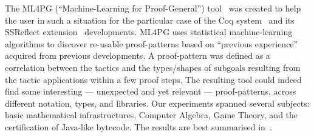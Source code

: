 % 
% 
% 


The ML4PG (``Machine-Learning for Proof-General'') tool~\cite{KHG13,CICM13,HK14} was created to help the user in such a situation for the particular case of the Coq system~\cite{Coq} and its SSReflect extension~\cite{SSReflect} developments. ML4PG uses statistical machine-learning algorithms to discover re-usable proof-patterns based on ``previous experience'' acquired from previous developments. A proof-pattern was defined as a correlation between the tactics and the types/shapes of subgoals resulting from the tactic applications within a few proof steps. The resulting tool could indeed find some interesting --- unexpected and yet relevant --- proof-patterns,
across different notation, types, and libraries. Our experiments spanned several subjects: basic mathematical infrastructures, Computer Algebra, Game Theory, and the certification of Java-like bytecode. The results are best summarised in~\cite{CICM13,HK14}.

% 


